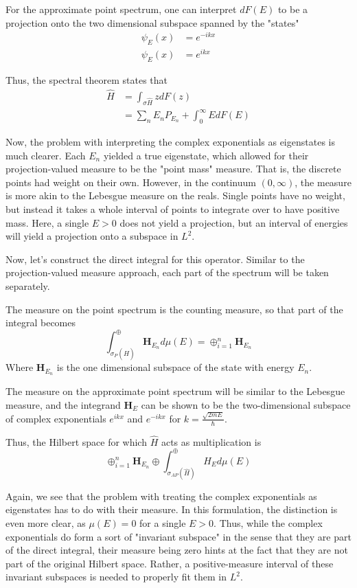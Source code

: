 For the approximate point spectrum, one can interpret $dF(E)$ to be a
projection onto the two dimensional subspace spanned by the "states"
\[
    \begin{aligned}
        \psi_{E}(x) &= e^{-ikx} \\
        \psi_{E}(x) &= e^{ikx}
    \end{aligned}
\]

Thus, the spectral theorem states that
\[
    \begin{aligned}
        \hat{H} &= \int_{\sigma{\hat{H}}}zdF(z)\\
                &= \sum_{n} E_n P_{E_n} + \int_0^{\infty}EdF(E)
    \end{aligned}
\]

Now, the problem with interpreting the complex exponentials as eigenstates is
much clearer. Each $E_n$ yielded a true eigenstate, which allowed for their
projection-valued measure to be the "point mass" measure. That is, the discrete
points had weight on their own. However, in the continuum $(0,\infty)$, the
measure is more akin to the Lebesgue measure on the reals. Single points have no
weight, but instead it takes a whole interval of points to integrate over to
have positive mass. Here, a single $E>0$ does not yield a projection, but an
interval of energies will yield a projection onto a subspace in $L^2$.

Now, let's construct the direct integral for this operator. Similar to the
projection-valued measure approach, each part of the spectrum will be taken
separately.

The measure on the point spectrum is the counting measure, so that part of
the integral becomes
\[
    \int_{\sigma_P(\hat{H})}^{\oplus}\textbf{H}_{E_n}d\mu(E) =
    \oplus_{i=1}^{n} \textbf{H}_{E_n}
\]
Where $\textbf{H}_{E_n}$ is the one dimensional subspace of the state with
energy $E_n$.

The measure on the approximate point spectrum will be similar to the Lebesgue
measure, and the integrand $\textbf{H}_E$ can be shown to be the two-dimensional
subspace of complex exponentials $e^{ikx}$ and $e^{-ikx}$ for
$k=\frac{\sqrt{2mE}}{\hbar}$.

Thus, the Hilbert space for which $\hat{H}$ acts as multiplication is
\[
    \oplus_{i=1}^n \textbf{H}_{E_n} \oplus
    \int_{\sigma_{AP}(\hat{H})}^{\oplus} H_Ed\mu(E)
\]

Again, we see that the problem with treating the complex exponentials as
eigenstates has to do with their measure. In this formulation, the distinction
is even more clear, as $\mu(E)=0$ for a single $E>0$. Thus, while the complex
exponentials do form a sort of "invariant subspace" in the sense that they are
part of the direct integral, their measure being zero hints at the fact that
they are not part of the original Hilbert space. Rather, a positive-measure
interval of these invariant subspaces is needed to properly fit them in $L^2$.

